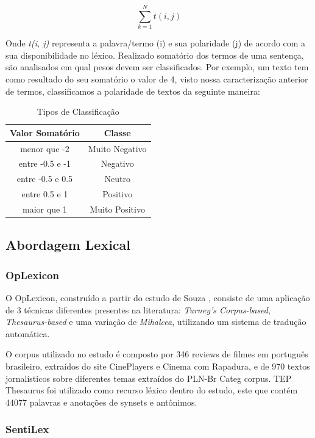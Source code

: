 \documentclass[conference]{IEEEtran}
\begin{document}
\begin{equation*}
    \sum_{k=1}^{N} t(i,j)
\end{equation*}

Onde \textit{t(i, j)} representa a palavra/termo (i) e sua polaridade (j) de acordo com a sua disponibilidade no léxico. Realizado somatório dos termos de uma sentença, são analisados em qual pesos devem ser classificados. Por exemplo, um texto tem como resultado do seu somatório o valor de 4, visto nossa caracterização anterior de termos, classificamos a polaridade de textos da seguinte maneira: 

\begin{table}[H]
\caption{Tipos de Classificação} \label{tab:long} 
\centering
\begin{tabular}{|c|c|}
\hline
Valor Somatório & Classe \\ \hline
menor que -2 & Muito Negativo \\ 
entre -0.5 e -1 & Negativo \\ 
entre -0.5 e 0.5 & Neutro \\ 
entre 0.5 e 1 & Positivo \\ 
maior que 1 & Muito Positivo \\ \hline
\end{tabular}
\end{table}

\subsection{Abordagem Lexical}

\subsubsection{OpLexicon}

O OpLexicon, construído a partir do estudo de Souza \cite{Souza:2011}, consiste de uma aplicação de 3 técnicas diferentes presentes na literatura: \textit{Turney's Corpus-based}, \textit{Thesaurus-based} e uma variação de \textit{Mihalcea}, utilizando um sistema de tradução automática. 

O corpus utilizado no estudo é composto por 346 reviews de filmes em português brasileiro, extraídos do site CinePlayers e Cinema com Rapadura, e de 970 textos jornalísticos sobre diferentes temas extraídos do PLN-Br Categ corpus. TEP Thesaurus foi utilizado como recurso léxico dentro do estudo, este que contém 44077 palavras e anotações de synsets e antônimos. 

\subsubsection{SentiLex}
\end{document}
